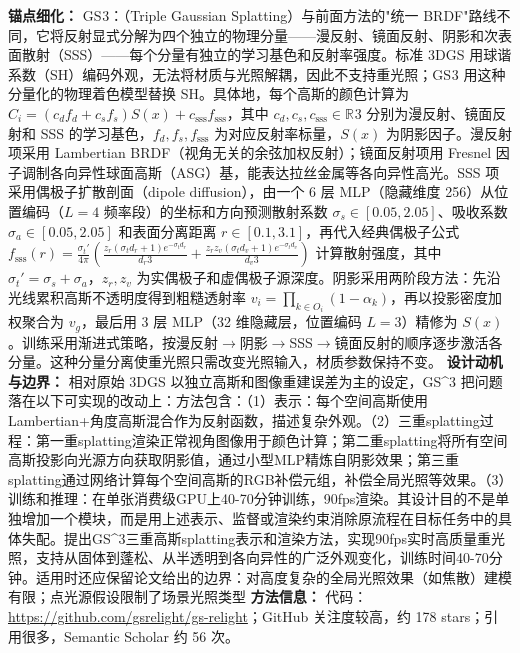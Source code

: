 \textbf{锚点细化：} GS$^{}3$：（Triple Gaussian Splatting）与前面方法的"统一 BRDF"路线不同，它将反射显式分解为四个独立的物理分量——漫反射、镜面反射、阴影和次表面散射（SSS）——每个分量有独立的学习基色和反射率强度。标准 3DGS 用球谐系数（SH）编码外观，无法将材质与光照解耦，因此不支持重光照；GS$^{}3$ 用这种分量化的物理着色模型替换 SH。具体地，每个高斯的颜色计算为 $C_i = (c_d f_d + c_s f_s) S(x) + c_{\mathrm{sss}} f_{\mathrm{sss}}$，其中 $c_d, c_s, c_{\mathrm{sss}} \in \mathbb{R}^{}3$ 分别为漫反射、镜面反射和 SSS 的学习基色，$f_d, f_s, f_{\mathrm{sss}}$ 为对应反射率标量，$S(x)$ 为阴影因子。漫反射项采用 Lambertian BRDF（视角无关的余弦加权反射）；镜面反射项用 Fresnel 因子调制各向异性球面高斯（ASG）基，能表达拉丝金属等各向异性高光。SSS 项采用偶极子扩散剖面（dipole diffusion），由一个 6 层 MLP（隐藏维度 256）从位置编码（$L=4$ 频率段）的坐标和方向预测散射系数 $\sigma_s \in [0.05, 2.05]$、吸收系数 $\sigma_a \in [0.05, 2.05]$ 和表面分离距离 $r \in [0.1, 3.1]$，再代入经典偶极子公式 $f_{\mathrm{sss}}(r) = \frac{\sigma_t'}{4\pi}\!\left(\frac{z_r(\sigma_t d_r + 1)e^{-\sigma_t d_r}}{d_r^{}3} + \frac{z_r z_v(\sigma_t d_v + 1)e^{-\sigma_t d_v}}{d_v^{}3}\right)$ 计算散射强度，其中 $\sigma_t' = \sigma_s + \sigma_a$，$z_r, z_v$ 为实偶极子和虚偶极子源深度。阴影采用两阶段方法：先沿光线累积高斯不透明度得到粗糙透射率 $v_i = \prod_{k \in O_i}(1-\alpha_k)$，再以投影密度加权聚合为 $v_g$，最后用 3 层 MLP（32 维隐藏层，位置编码 $L=3$）精修为 $S(x)$。训练采用渐进式策略，按漫反射$\to$阴影$\to$SSS$\to$镜面反射的顺序逐步激活各分量。这种分量分离使重光照只需改变光照输入，材质参数保持不变。
\textbf{设计动机与边界：} 相对原始 3DGS 以独立高斯和图像重建误差为主的设定，GS\^{}3 把问题落在以下可实现的改动上：方法包含：（1）表示：每个空间高斯使用Lambertian+角度高斯混合作为反射函数，描述复杂外观。（2）三重splatting过程：第一重splatting渲染正常视角图像用于颜色计算；第二重splatting将所有空间高斯投影向光源方向获取阴影值，通过小型MLP精炼自阴影效果；第三重splatting通过网络计算每个空间高斯的RGB补偿元组，补偿全局光照等效果。（3）训练和推理：在单张消费级GPU上40-70分钟训练，90fps渲染。其设计目的不是单独增加一个模块，而是用上述表示、监督或渲染约束消除原流程在目标任务中的具体失配。提出GS\^{}3三重高斯splatting表示和渲染方法，实现90fps实时高质量重光照，支持从固体到蓬松、从半透明到各向异性的广泛外观变化，训练时间40-70分钟。适用时还应保留论文给出的边界：对高度复杂的全局光照效果（如焦散）建模有限；点光源假设限制了场景光照类型
\textbf{方法信息：} 代码：\url{https://github.com/gsrelight/gs-relight}；GitHub 关注度较高，约 178 stars；引用很多，Semantic Scholar 约 56 次。



